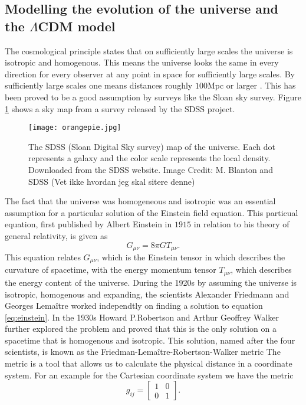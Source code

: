 \subsection{Modelling the evolution of the universe and the $\Lambda$CDM model}
The cosmological principle states that on sufficiently
large scales the universe is isotropic and homogenous. This means the universe
looks the same in every direction for every observer at any point in space for
sufficiently large scales. By sufficiently large scales one means
distances roughly $100$Mpc or larger \cite[p.~12]{ryden2017introduction}. This has been proved to be a good
assumption by surveys like the Sloan sky survey. Figure \ref{fig:sdssmap} shows a sky map from a survey released by the
SDSS project.\\
\begin{figure}[htbp]\label{fig:sdssmap}
    \texttt{[image: orangepie.jpg]}
    \caption{The SDSS (Sloan Digital Sky survey) map of the universe. Each dot represents a galaxy and the color scale represents the local density. Downloaded from the SDSS website. Image Credit: M. Blanton and SDSS (Vet ikke hvordan jeg skal sitere denne)}
\end{figure}
The fact that the universe was homogeneous and isotropic was an essential assumption
for a particular solution of the Einstein field equation. 
This particual equation, first published by Albert Einstein in $1915$ \cite{Einstein1915} in relation to his theory of general relativity, is given as
\begin{equation}\label{eq:einstein}
    G_{\mu\nu}=8\pi GT_{\mu\nu}.
\end{equation}
This equation relates $G_{\mu\nu}$, which is the Einstein tensor in which describes the curvature of spacetime, with the energy momentum tensor
$T_{\mu\nu}$, which describes the energy content of the universe. During the 1920s by assuming the universe is isotropic, homogenous and expanding, the scientists Alexander Friedmann and Georges Lemaître worked independtly on finding a solution to equation \ref{eq:einstein}. In the 1930s Howard P.Robertson and Arthur Geoffrey Walker further explored the problem and proved that this is the only solution on a spacetime that is homogenous and isotropic.
This solution, named after the four scientists, is known as the Friedman-Lemaître-Robertson-Walker metric
The metric is a tool that allows us to calculate the physical distance in a coordinate system.
For an example for the Cartesian coordinate system we have the metric 
\begin{equation}
    g_{ij}=
    \begin{bmatrix}
        1 & 0 \\
        0 & 1 
    \end{bmatrix}.
\end{equation}
